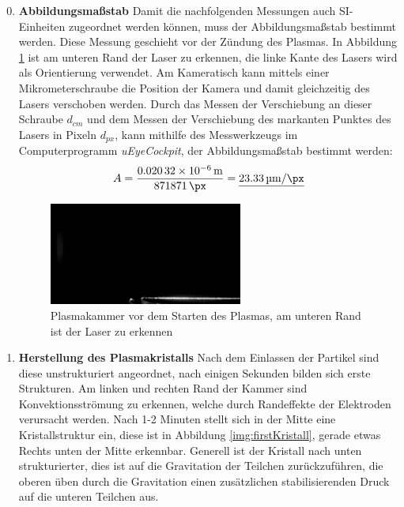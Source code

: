 \documentclass[12pt,a4paper,ngerman]{article}
\begin{document}
	\begin{enumerate}[font=\bfseries]
		\setcounter{enumi}{-1}
		\item \textbf{Abbildungsmaßstab}
		Damit die nachfolgenden Messungen auch SI-Einheiten zugeordnet werden können, muss der Abbildungsmaßstab bestimmt werden. Diese Messung geschieht vor der Zündung des Plasmas. In Abbildung \ref{img:Kalibration} ist am unteren Rand der Laser zu erkennen, die linke Kante des Lasers wird als Orientierung verwendet. Am Kameratisch kann mittels einer Mikrometerschraube die Position der Kamera und damit gleichzeitig des Lasers verschoben werden. Durch das Messen der Verschiebung an dieser Schraube $d_{cm}$ und dem Messen der Verschiebung des markanten Punktes des Lasers in Pixeln $d_{px}$, kann mithilfe des Messwerkzeugs im Computerprogramm \textit{uEyeCockpit}, der Abbildungsmaßstab bestimmt werden:
		\begin{equation}
			A = \frac{\SI{0.02032E-6}{\meter}}{871 \SI{871}{\px}} = \underline{\SI{23.33}{\micro \meter \per \px}}
		\end{equation}  
		
		\begin{figure}[ht]
			\centering
			\includegraphics[width=0.6\textwidth]{data/calibration.png}		
			\caption{Plasmakammer vor dem Starten des Plasmas, am unteren Rand ist der Laser zu erkennen}
			\label{img:Kalibration}
		\end{figure}
		\item\textbf{Herstellung des Plasmakristalls}
		Nach dem Einlassen der Partikel sind diese unstrukturiert angeordnet, nach einigen Sekunden bilden sich erste Strukturen. Am linken und rechten Rand der Kammer sind Konvektionsströmung zu erkennen, welche durch Randeffekte der Elektroden verursacht werden. Nach 1-2 Minuten stellt sich in der Mitte eine Kristallstruktur ein, diese ist in Abbildung \ref{img:firstKristall}, gerade etwas Rechts unten der Mitte erkennbar. Generell ist der Kristall nach unten strukturierter, dies ist auf die Gravitation der Teilchen zurückzuführen, die oberen üben durch die Gravitation einen zusätzlichen stabilisierenden Druck auf die unteren Teilchen aus.
		

\end{enumerate}
\end{document}
